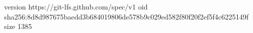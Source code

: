 version https://git-lfs.github.com/spec/v1
oid sha256:8d8d987675baedd3b684019806de578b9c029ed582f80f20f2ef5f4c6225149f
size 1385
